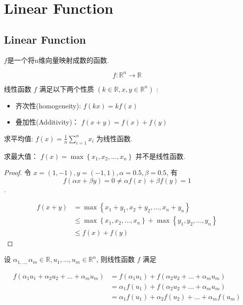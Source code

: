 \chapter{Linear Function}

\section{Linear Function}

\begin{definition}
    $f$是一个将n维向量映射成数的函数. 

    $$ f: \mathbb{R}^{n} \rightarrow \mathbb{R} $$
\end{definition}

线性函数 $ f $ 满足以下两个性质 $ \left(k \in \mathbb{R}, x, y \in \mathbb{R}^{n}\right) $ :

\begin{itemize}
    \item 齐次性(homogeneity): $ f(k x)=k f(x) $
    \item 叠加性(Additivity)： $ f(x+y)=f(x)+f(y) $
\end{itemize}

\begin{example}
    求平均值: $ f(x)=\frac{1}{n} \sum_{i=1}^{n} x_{i} $ 为线性函数. 
\end{example}

\begin{example}
    求最大值： $ f(x)=\max \left\{x_{1}, x_{2}, \ldots, x_{n}\right\} $ 并不是线性函数. 
\end{example}

\begin{proof}
   令 $ x=(1,-1), y=(-1,1), \alpha=0.5, \beta=0.5 $, 
   有 $$ f(\alpha x+\beta y)=0 \neq \alpha f(x)+\beta f(y)=1 $$.

   $$ \begin{aligned} f(x+y) 
    &=\max \left\{x_{1}+y_{1}, x_{2}+y_{2}, \ldots, x_{n}+y_{n}\right\} 
    \\ & \leq \max \left\{x_{1}, x_{2}, \ldots, x_{n}\right\}+\max \left\{y_{1}, y_{2}, \ldots, y_{n}\right\} 
    \\ & \leq f(x)+f(y) \end{aligned} $$
\end{proof}

\begin{theorem}
    设 $ \alpha_{1, \ldots,} \alpha_{m} \in \mathbb{R}, u_{1}, \ldots, u_{m} \in \mathbb{R}^{n} $, 则线性函数 $ f $ 满足

    $$ \begin{aligned} f\left(\alpha_{1} u_{1}+\alpha_{2} u_{2}+\ldots+\alpha_{m} u_{m}\right) &=f\left(\alpha_{1} u_{1}\right)+f\left(\alpha_{2} u_{2}+\ldots+\alpha_{m} u_{m}\right) \\ &=\alpha_{1} f\left(u_{1}\right)+f\left(\alpha_{2} u_{2}+\ldots+\alpha_{m} u_{m}\right) \\ &=\alpha_{1} f\left(u_{1}\right)+\alpha_{2} f\left(u_{2}\right)+\ldots+\alpha_{m} f\left(u_{m}\right) \end{aligned} $$
\end{theorem}


